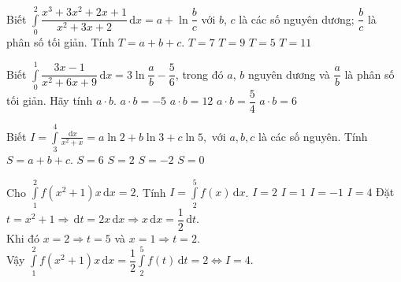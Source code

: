 \begin{ex}%
Biết $\displaystyle\int\limits_0^2 \dfrac{x^3 + 3x^2 + 2x + 1}{x^2 + 3x + 2}\mathrm{\, d}x = a + \ln \dfrac{b}{c}$ với $b$, $c$ là các số nguyên dương; $\dfrac{b}{c}$ là phân số tối giản. Tính $T = a + b + c$.
\choice
{$ T=7 $}
{$ T=9 $}
{$ T=5 $}
{$ T=11 $}
\end{ex}
\begin{ex}%
Biết $\displaystyle\int\limits_0^1 {\dfrac{{3x - 1}}{{x^2 + 6x + 9}}\mathrm{\, d}x} = 3\ln \dfrac{a}{b} - \dfrac{5}{6}$, trong đó $a$, $b$ nguyên dương và $\dfrac{a}{b}$ là phân số tối giản. Hãy tính $a\cdot b$.
\choice
{$ a\cdot b=-5 $}
{\True $ a\cdot b=12 $}
{$ a\cdot b=\dfrac{5}{4} $}
{$ a\cdot b=6 $}
\end{ex}
\begin{ex}%
	Biết $I=\displaystyle\int\limits_{3}^{4}
	{\frac{\mathrm{\,d}x}{x^2+x}=a\ln 2+b\ln 3+c\ln 5,}$ với $a,b,c$ là các số nguyên. Tính $S=a+b+c.$
	\choice
	{$S=6$}
	{\True $S=2$}
	{$S=-2$}
	{$S=0$}
\end{ex}
\begin{ex}%
	Cho $\displaystyle\int\limits_1^2 f(x^2+1)x\mathrm{\,d}x=2$. Tính  $I=\displaystyle\int\limits_2^5 f(x)\mathrm{\,d}x$.
	\choice
	{$I=2$}
	{$I=1$}
	{$I=-1$}
	{\True $I=4$}
	\loigiai
	{
		Đặt $t=x^2+1\Rightarrow\mathrm{\,d}t=2x\mathrm{\,d}x\Rightarrow x\mathrm{\,d}x=\dfrac{1}{2}\mathrm{\,d}t$.\\
		Khi đó $x=2\Rightarrow t=5$ và $x=1\Rightarrow t=2$.\\
		Vậy $\displaystyle\int\limits_1^2 f(x^2+1)x\mathrm{\,d}x=\dfrac{1}{2}\displaystyle\int\limits_2^5 f(t)\mathrm{\,d}t=2 \Leftrightarrow I=4$.
	}
\end{ex}
